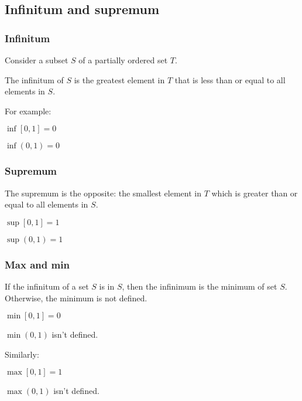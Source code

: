 
\subsection{Infinitum and supremum}

\subsubsection{Infinitum}

Consider a subset \(S\) of a partially ordered set \(T\).

The infinitum of \(S\) is the greatest element in \(T\) that is less than or equal to all elements in \(S\).

For example:

\(\inf [0,1]=0\)

\(\inf (0,1)=0\)

\subsubsection{Supremum}

The supremum is the opposite: the smallest element in \(T\) which is greater than or equal to all elements in \(S\).

\(\sup [0,1]=1\)

\(\sup (0,1)=1\)

\subsubsection{Max and min}

If the infinitum of a set \(S\) is in \(S\), then the infinimum is the minimum of set \(S\). Otherwise, the minimum is not defined.

\(\min [0,1]=0\)

\(\min (0,1)\) isn't defined.

Similarly:

\(\max [0,1]=1\)

\(\max (0,1)\) isn't defined.

